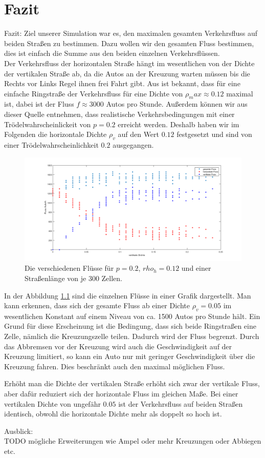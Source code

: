 \chapter{Fazit}

Fazit: Ziel unserer Simulation war es, den maximalen gesamten Verkehrsfluss auf beiden Straßen zu bestimmen. Dazu wollen wir den gesamten Fluss bestimmen, dies ist einfach die Summe aus den beiden einzelnen Verkehrsflüssen.\\

Der Verkehrsfluss der horizontalen Straße hängt im wesentlichen von der Dichte der vertikalen Straße ab, da die Autos an der Kreuzung warten müssen bis die Rechts vor Links Regel ihnen frei Fahrt gibt. Aus \cite{book:bungartz} ist bekannt, dass für eine einfache Ringstraße der Verkehrsfluss für eine Dichte von $\rho_max \approx 0.12$ maximal ist, dabei ist der Fluss $f \approx 3000$ Autos pro Stunde. Außerdem können wir aus dieser Quelle entnehmen, dass realistische Verkehrsbedingungen mit einer Trödelwahrscheinlickeit von $p=0.2$ erreicht werden. Deshalb haben wir im Folgenden die horizontale Dichte $\rho_v$ auf den Wert $0.12$ festgesetzt und sind von einer Trödelwahrscheinlichkeit $0.2$ ausgegangen. 
%
\begin{figure}[h]%
\centering
\includegraphics[width=17cm]{MaxFluss.png}%
\caption{Die verschiedenen Flüsse für $p=0.2$, $rho_h=0.12$ und einer Straßenlänge von je 300 Zellen.  }%
\label{pic:MaxFluss}%
\end{figure}
%
In der Abbildung \ref{pic:MaxFluss} sind die einzelnen Flüsse in einer Grafik dargestellt. Man kann erkennen, dass sich der gesamte Fluss ab einer Dichte $\rho_v =0.05$ im wesentlichen Konstant auf einem Niveau von ca. 1500 Autos pro Stunde hält. Ein Grund für diese Erscheinung ist die Bedingung, dass sich beide Ringstraßen eine Zelle, nämlich die Kreuzungszelle teilen. Dadurch wird der Fluss begrenzt. Durch das Abbremsen vor der Kreuzung wird auch die Geschwindigkeit auf der Kreuzung limitiert, so kann ein Auto nur mit geringer Geschwindigkeit über die Kreuzung fahren. Dies beschränkt auch den maximal möglichen Fluss.

Erhöht man die Dichte der vertikalen Straße erhöht sich zwar der vertikale Fluss, aber dafür reduziert sich der horizontale Fluss im gleichen Maße. Bei einer vertikalen Dichte von ungefähr $0.05$ ist der Verkehrsfluss auf beiden Straßen identisch, obwohl die horizontale Dichte mehr als doppelt so hoch ist.

Ausblick:\\
TODO mögliche Erweiterungen wie Ampel oder mehr Kreuzungen oder Abbiegen etc.
